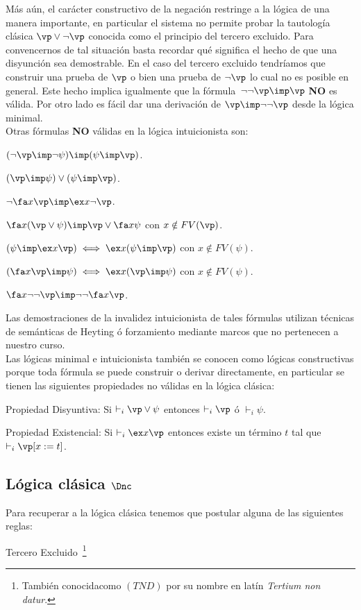 \documentclass[11pt,letterpaper]{article}
\begin{document}
Más aún, el carácter constructivo de la negación restringe a la lógica de una 
manera importante, en particular el sistema no permite probar la tautología 
clásica $ \vp\lor\lnot\vp $
conocida como el principio del tercero excluido. Para convencernos de tal
situación basta recordar qué significa el hecho de que una disyunción sea
demostrable. En el caso del tercero excluido tendríamos que construir 
una prueba de $\vp$ o bien una prueba de $\neg\vp$ lo cual no es posible en
general. Este hecho implica igualmente que la fórmula~$\lnot\lnot\vp\imp\vp$
\textbf{NO} es válida. Por otro lado es fácil dar una derivación
de $\vp\imp\lnot\lnot\vp$ desde la lógica minimal. \\
Otras fórmulas \textbf{NO} válidas en la lógica intuicionista son:
\bi
\item $(\lnot\vp\imp\lnot\psi)\imp(\psi\imp\vp)$.
\item $(\vp\imp\psi)\lor(\psi\imp\vp)$.
\item $\lnot\fa x\vp\imp\ex x\neg\vp$.
\item $\fa x(\vp\lor\psi)\imp\vp\lor\fa x\psi$ con $x\notin FV(\vp)$.
\item $(\psi\imp\ex x\vp)\iff \ex x(\psi\imp\vp)$ con $x\notin FV(\psi)$.
\item $(\fa x\vp\imp\psi)\iff \ex x(\vp\imp\psi)$ con $x\notin FV(\psi)$.
\item $\fa x\lnot\lnot\vp\imp \lnot\lnot\fa x\vp$.
\ei

Las demostraciones de la invalidez intuicionista de tales fórmulas utilizan 
técnicas de semánticas de Heyting ó forzamiento mediante marcos que no 
pertenecen a nuestro curso.\\

Las lógicas minimal e intuicionista también se conocen como lógicas 
constructivas porque toda fórmula se puede construir o derivar directamente,
en particular se tienen las siguientes propiedades no válidas en la lógica 
clásica:
\bi
 \item Propiedad Disyuntiva: Si $\vdash_{i}\vp\lor\psi$ entonces
  $\vdash_{i}\vp$ ó $\vdash_{i}\psi$.
 \item Propiedad Existencial: Si $\vdash_{i} \ex x\vp$ entonces existe un
  término $t$ tal que $\vdash_{i}\vp[x:=t]$.
\ei


\subsection{Lógica clásica $\Dnc$}
Para recuperar a la lógica clásica tenemos que postular alguna de las
siguientes reglas:
\bi
\item Tercero Excluido~\footnote{También conocidacomo $(TND)$ por
  su nombre en latín \textit{Tertium non datur}.}
\begin{mathpar}
\end{mathpar}
\end{document}
